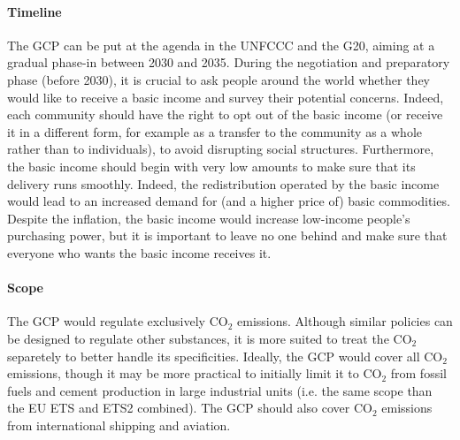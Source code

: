 \documentclass[12pt,english]{article}
\begin{document}
\paragraph{Timeline} 
The GCP can be put at the agenda in the UNFCCC and the G20, aiming at a gradual phase-in between 2030 and 2035. During the negotiation and preparatory phase (before 2030), it is crucial to ask people around the world whether they would like to receive a basic income and survey their potential concerns. Indeed, each community should have the right to opt out of the basic income (or receive it in a different form, for example as a transfer to the community as a whole rather than to individuals), to avoid disrupting social structures. Furthermore, the basic income should begin with very low amounts to make sure that its delivery runs smoothly. Indeed, the redistribution operated by the basic income would lead to an increased demand for (and a higher price of) basic commodities. Despite the inflation, the basic income would increase low-income people's purchasing power, but it is important to leave no one behind and make sure that everyone who wants the basic income receives it. %

\paragraph{Scope} 
The GCP would regulate exclusively CO$_\text{2}$ emissions. Although similar policies can be designed to regulate other substances, it is more suited to treat the CO$_\text{2}$ separetely to better handle its specificities. Ideally, the GCP would cover all CO$_\text{2}$ emissions, though it may be more practical to initially limit it to CO$_\text{2}$ from fossil fuels and cement production in large industrial units (i.e. the same scope than the EU ETS and ETS2 combined). The GCP should also cover CO$_\text{2}$ emissions from international shipping and aviation. 
\end{document}

